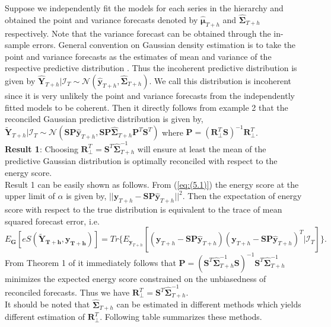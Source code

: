 \documentclass[a4paper, 11pt]{article}
\begin{document}
\noindent
Suppose we independently fit the models for each series in the hierarchy and obtained the point and variance forecasts denoted by $\hat{\bm{\mu}}_{T+h}$ and $\hat{\bm{\Sigma}}_{T+h}$ respectively. Note that the variance forecast can be obtained through the in-sample errors. General convention on Gaussian density estimation is to take the point and variance forecasts as the estimates of mean and variance of the respective predictive distribution \citep{Hall2007}. Thus the incoherent predictive distribution is given by  $\hat{\bm{Y}}_{T+h}| \bm{\mathcal{I}}_T \sim \mathscr{N}(\hat{\bm{y}}_{T+h}, \hat{\bm{\Sigma}}_{T+h})$. We call this distribution is incoherent since it is very unlikely the point and variance forecasts from the independently fitted models to be coherent. Then it directly follows from example 2 that the reconciled Gaussian predictive distribution is given by, $\tilde{\bm{Y}}_{T+h}| \bm{\mathcal{I}}_T \sim \mathscr{N}(\bm{SP}\hat{\bm{y}}_{T+h}, \bm{SP}\hat{\bm{\Sigma}}_{T+h}\bm{P}^T\bm{S}^T)$ where $\bm{P} = (\bm{R}^T_\bot \bm{S})^{-1}\bm{R}^T_\bot$.\\

\noindent
\textbf{Result 1}: Choosing $\bm{R}^T_\bot = \bm{S}^T\hat{\bm{\Sigma}}_{T+h}^{-1}$ will ensure at least the mean of the predictive Gaussian distribution is optimally reconciled with respect to the energy score.\\

\noindent
Result 1 can be easily shown as follows. From (\ref{eq:(5.1)}) the energy score at the upper limit of $\alpha$ is given by, $||\bm{y}_{T+h}-\bm{SP}\hat{\bm{y}}_{T+h}||^2$. Then the expectation of energy score with respect to the true distribution is equivalent to the trace of mean squared forecast error, i.e. $$E_{\bm{G}}[eS(\bm{\tilde{Y}_{T+h},y_{T+h}})]= Tr\{E_{\bm{y}_{T+h}}[(\bm{y}_{T+h}-\bm{SP}\hat{\bm{y}}_{T+h})(\bm{y}_{T+h}-\bm{SP}\hat{\bm{y}}_{T+h})^T|\mathcal{I}_{T}]\}.$$ 
\noindent
From Theorem 1 of \citet{Wickramasuriya2017} it immediately follows that $\bm{P} = (\bm{S}^T\bm\hat{\bm{\Sigma}}_{T+h}^{-1}\bm{S})^{-1}\bm{S}^T\bm\hat{\bm{\Sigma}}_{T+h}^{-1}$ minimizes the expected energy score constrained on the unbiasedness of reconciled forecasts. Thus we have $\bm{R}^T_\bot = \bm{S}^T\hat{\bm{\Sigma}}_{T+h}^{-1}$. \\

\noindent
It should be noted that $\hat{\bm{\Sigma}}_{T+h}$ can be estimated in different methods which yields different estimation of $\bm{R}^T_\bot$. Following table summarizes these methods. 
\end{document}
